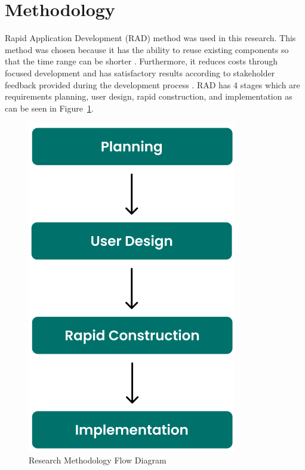 \documentclass[conference,a4paper]{IEEEtran}
\begin{document}
\section{Methodology}
\label{sect:methodology}

Rapid Application Development (RAD) method was used in this research. This method was chosen because it has the ability to reuse existing components so that the time range can be shorter \cite{b7}. Furthermore, it reduces costs through focused development and has satisfactory results according to stakeholder feedback provided during the development process \cite{b8}. RAD has 4 stages which are requirements planning, user design, rapid construction, and implementation as can be seen in Figure~\ref{method}.

\begin{figure}[htb]
  \centering
  \includegraphics [width=3 cm, height=4.5 cm]{images/method}
  \caption{Research Methodology Flow Diagram}
  \label{method}
\end{figure}
\end{document}
